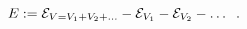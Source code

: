 \begin{equation}
E:={\cal E}_{V=V_1+V_2+\dots}-{\cal E}_{V_1} -{\cal E}_{V_2} -\dots 
\; \; . 
\label{ren2}
\end{equation}

